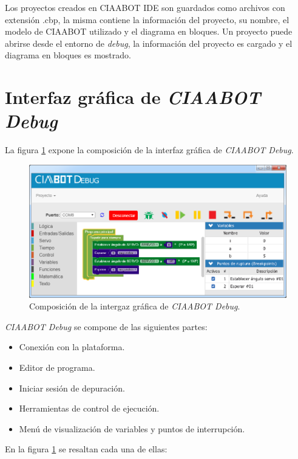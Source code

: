 Los proyectos creados en CIAABOT IDE son guardados como archivos con extensión .cbp, la misma contiene la información del proyecto, su nombre, el modelo de CIAABOT utilizado
y el diagrama en bloques. Un proyecto puede abrirse desde el entorno de \emph{debug}, la información del proyecto es cargado y el diagrama en bloques es mostrado.

\section{Interfaz gráfica de \emph{CIAABOT Debug}}
La figura \ref{fig:debug-modos} expone la composición de la interfaz gráfica de \emph{CIAABOT Debug}.


\begin{figure}[!htbp]
	\begin{center}  %
		\includegraphics[width=15cm]{./Figures/CIAABOT-DEBUG-GUI-2.png}
		\par\caption{Composición de la intergaz gráfica de \emph{CIAABOT Debug}.}\label{fig:debug-modos}
	\end{center}
\end{figure}


\emph{CIAABOT Debug} se compone de las siguientes partes:

\begin{itemize}
\item
Conexión con la plataforma.
\item
Editor de programa.	
\item
Iniciar sesión de depuración.
\item
Herramientas de control de ejecución.
\item
Menú de visualización de variables y puntos de interrupción.
\end{itemize}

En la figura \ref{fig:debug-modos} se resaltan cada una de ellas:

